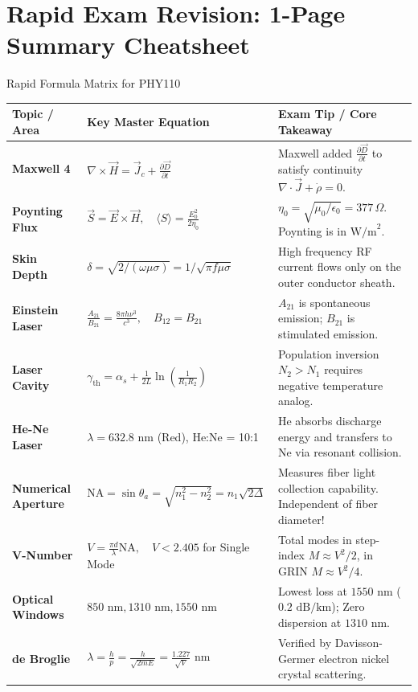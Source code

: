 \chapter{Rapid Exam Revision: 1-Page Summary Cheatsheet}

\begin{formulabox}{Rapid Formula Matrix for PHY110}
\begin{tabularx}{\textwidth}{l X X}
\toprule
\textbf{Topic / Area} & \textbf{Key Master Equation} & \textbf{Exam Tip / Core Takeaway} \\
\midrule
\textbf{Maxwell 4} & $\nabla \times \vec{H} = \vec{J}_c + \frac{\partial \vec{D}}{\partial t}$ & Maxwell added $\frac{\partial \vec{D}}{\partial t}$ to satisfy continuity $\nabla\cdot\vec{J} + \dot{\rho}=0$. \\
\textbf{Poynting Flux} & $\vec{S} = \vec{E} \times \vec{H}, \quad \langle S \rangle = \frac{E_0^2}{2\eta_0}$ & $\eta_0 = \sqrt{\mu_0/\epsilon_0} = 377\,\Omega$. Poynting is in $\text{W/m}^2$. \\
\textbf{Skin Depth} & $\delta = \sqrt{2/(\omega\mu\sigma)} = 1/\sqrt{\pi f \mu \sigma}$ & High frequency RF current flows only on the outer conductor sheath. \\
\midrule
\textbf{Einstein Laser} & $\frac{A_{21}}{B_{21}} = \frac{8\pi h \nu^3}{c^3}, \quad B_{12} = B_{21}$ & $A_{21}$ is spontaneous emission; $B_{21}$ is stimulated emission. \\
\textbf{Laser Cavity} & $\gamma_{\text{th}} = \alpha_s + \frac{1}{2L}\ln\left(\frac{1}{R_1 R_2}\right)$ & Population inversion $N_2 > N_1$ requires negative temperature analog. \\
\textbf{He-Ne Laser} & $\lambda = 632.8\text{ nm}$ (Red), He:Ne = 10:1 & He absorbs discharge energy and transfers to Ne via resonant collision. \\
\midrule
\textbf{Numerical Aperture} & $\text{NA} = \sin\theta_a = \sqrt{n_1^2 - n_2^2} = n_1\sqrt{2\Delta}$ & Measures fiber light collection capability. Independent of fiber diameter! \\
\textbf{V-Number} & $V = \frac{\pi d}{\lambda}\text{NA}, \quad V < 2.405$ for Single Mode & Total modes in step-index $M \approx V^2/2$, in GRIN $M \approx V^2/4$. \\
\textbf{Optical Windows} & $850\text{ nm}, 1310\text{ nm}, 1550\text{ nm}$ & Lowest loss at $1550\text{ nm}$ ($0.2\text{ dB/km}$); Zero dispersion at $1310\text{ nm}$. \\
\midrule
\textbf{de Broglie} & $\lambda = \frac{h}{p} = \frac{h}{\sqrt{2mE}} = \frac{1.227}{\sqrt{V}}\text{ nm}$ & Verified by Davisson-Germer electron nickel crystal scattering. \\

\end{tabularx}
\end{formulabox}
